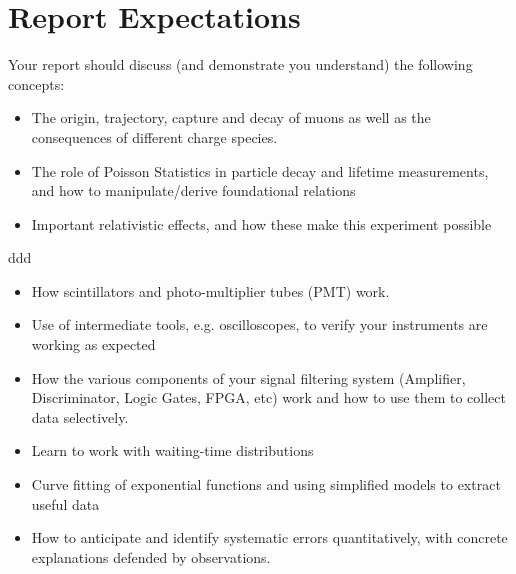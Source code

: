 \documentclass[aps,prb,groupedaddress,notitlepage,nofootinbib]{revtex4-1} %
\begin{document}
\medskip




\bigskip
\newpage

\section{Report Expectations}
Your report should discuss (and demonstrate you understand) the following concepts:
\vspace{3cm}
\begin{tcolorbox}[center,halign=flush center,title={Physics Concepts},colframe=physicsconcept,colbacktitle=physicsconcept,width=0.7\textwidth]{
\begin{itemize}
\item The origin, trajectory, capture and decay of muons as well as the consequences of different charge species. 
\item The role of Poisson Statistics in particle decay and lifetime measurements, and how to manipulate/derive foundational relations
\item Important relativistic effects, and how these make this experiment possible
\end{itemize}}
\end{tcolorbox}
\vspace{2cm}ddd



\begin{tcolorbox}[
enhanced jigsaw, bicolor, center, halign= center,center lower, colback=white,
colframe=instrumentconcept, colbacktitle=instrumentconcept, title=testing, width=0.5\textwidth, height=0.5\textwidth,  arc=1cm, valign= center,opacityback=0.9]
{

\begin{itemize}
\item How scintillators and photo-multiplier tubes (PMT) work. 
\item Use of intermediate tools, e.g. oscilloscopes, to verify your instruments are working as expected
\item How the various components of your signal filtering system (Amplifier, Discriminator, Logic Gates, FPGA, etc) work and how to use them to collect data selectively.
\end{itemize}
}
\end{tcolorbox}
\vspace{2cm}

\begin{tcolorbox}[center,halign=flush center,title={Analysis Concepts},colframe=analysisconcept,colbacktitle=analysisconcept,width=0.7\textwidth]{
\begin{itemize}
\item Learn to work with waiting-time distributions 
\item Curve fitting of exponential functions and using simplified models to extract useful data
\item How to anticipate and identify systematic errors quantitatively, with concrete explanations defended by observations. 
\end{itemize}
}
\end{tcolorbox}
\end{document}
